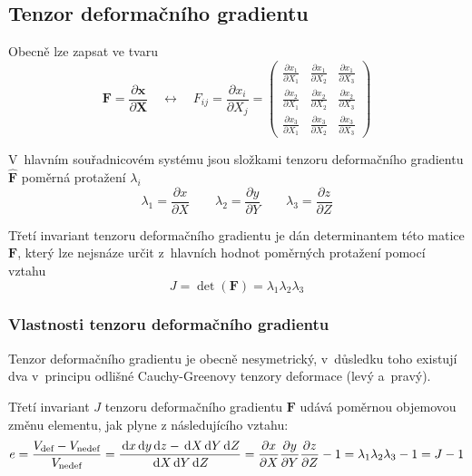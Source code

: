 
\subsection{Tenzor deformačního gradientu}
Obecně lze zapsat ve tvaru
\begin{equation}
\bm{F} = \frac{\partial \bm{x}}{\partial \bm{X}}
\quad\leftrightarrow\quad
F_{ij} = \frac{\partial x_i}{\partial X_j} = \begin{pmatrix}
\frac{\partial x_1}{\partial X_1} & \frac{\partial x_1}{\partial X_2} & \frac{\partial x_1}{\partial X_3}\\
\frac{\partial x_2}{\partial X_1} & \frac{\partial x_2}{\partial X_2} & \frac{\partial x_2}{\partial X_3}\\
\frac{\partial x_3}{\partial X_1} & \frac{\partial x_3}{\partial X_2} & \frac{\partial x_3}{\partial X_3}
\end{pmatrix}
\end{equation}

V~hlavním souřadnicovém systému jsou složkami tenzoru deformačního gradientu $\hat{\bm{F}}$ poměrná protažení $\lambda_i$
\begin{equation}
\lambda_1  = \frac{\partial x}{\partial X}
\qquad
\lambda_2  = \frac{\partial y}{\partial Y}
\qquad
\lambda_3  = \frac{\partial z}{\partial Z}
\end{equation}

Třetí invariant tenzoru deformačního gradientu je dán determinantem této matice $\bm{F}$, který lze nejsnáze určit z~hlavních hodnot poměrných protažení pomocí vztahu
\begin{equation}
J = \det(\bm{F}) = \lambda_1 \lambda_2 \lambda_3
\end{equation}

\subsubsection{Vlastnosti tenzoru deformačního gradientu}
Tenzor deformačního gradientu je obecně nesymetrický, v~důsledku toho existují dva v~principu odlišné Cauchy-Greenovy tenzory deformace (levý a~pravý).

Třetí invariant $J$ tenzoru deformačního gradientu $\bm{F}$ udává poměrnou objemovou změnu elementu, jak plyne z následujícího vztahu: 
\begin{equation}
	e
	= \frac{V_\text{def} - V_\text{nedef}}{V_\text{nedef}}
	= \frac{\,\mathrm{d} x \,\mathrm{d} y \,\mathrm{d} z - \,\mathrm{d} X \,\mathrm{d} Y \,\mathrm{d} Z}{\,\mathrm{d} X \,\mathrm{d} Y \,\mathrm{d} Z}
	= \frac{\partial x}{\partial X} \frac{\partial y}{\partial Y} \frac{\partial z}{\partial Z} - 1
	= \lambda_1 \lambda_2 \lambda_3 -1
	= J - 1
\end{equation}

